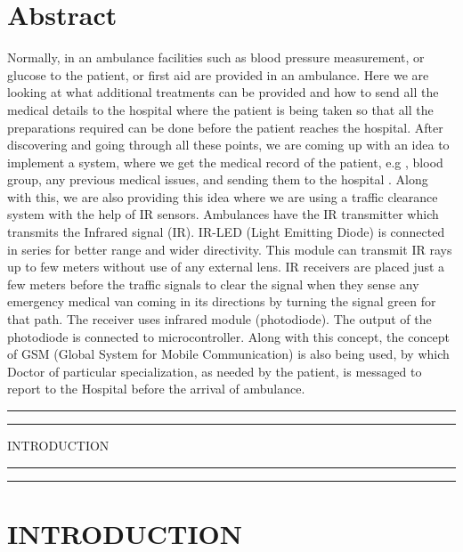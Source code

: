 \documentclass[12pt,a4paper,oneside,openright]{report}
\begin{document}
\chapter*{Abstract}
\doublespacing
Normally, in an ambulance facilities such as blood pressure measurement, or glucose to the patient, or first aid are provided in an ambulance. Here we are looking at what additional treatments can be provided and how to send all the medical details to the hospital where the patient is being taken so that all the preparations required can be done before the patient reaches the hospital. After discovering and going through all these points, we are coming up with an idea to implement a system, where we get the medical record of the patient, e.g , blood group, any previous medical issues, and sending them to the hospital . Along with this, we are also providing this idea where we are using a traffic clearance system with the help of IR sensors. Ambulances have the IR transmitter which transmits the Infrared signal (IR). IR-LED (Light Emitting Diode) is connected in series for better range and wider directivity. This module can transmit IR rays up to few meters without use of any external lens. IR receivers are placed just a few meters before the traffic signals to clear the signal when they sense any emergency medical van coming in its directions by turning the signal green for that path. The receiver uses infrared module (photodiode). The output of the photodiode is connected to microcontroller. Along with this concept, the concept of GSM (Global System for Mobile Communication) is also being used, by which Doctor of particular specialization, as needed by the patient, is messaged to report to the Hospital before the arrival of ambulance.


\newpage
{}



\newpage
\vspace*{\fill}
 \begin{center}
\hrule%
\vspace{1pt}%
\hrule
\vspace{1pc}%
\LARGE\MakeUppercase{INTRODUCTION} 
\vspace{1pc}%
\hrule%
\vspace{1pt}%
\hrule
 \end{center}
 \vspace*{\fill}

\chapter{INTRODUCTION}
\end{document}
